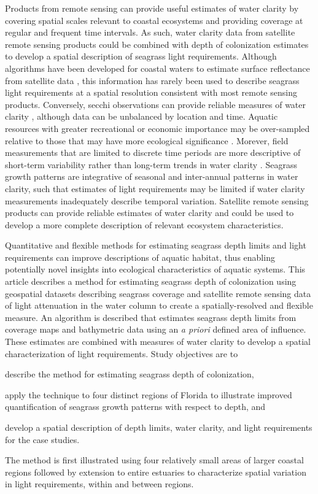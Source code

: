 \documentclass[letterpaper,12pt,oneside]{article}\usepackage[]{graphicx}\usepackage[]{color}
\begin{document}
Products from remote sensing can provide useful estimates of water clarity by covering spatial scales relevant to coastal ecosystems and providing coverage at regular and frequent time intervals.  As such, water clarity data from satellite remote sensing products could be combined with depth of colonization estimates to develop a spatial description of seagrass light requirements.  Although algorithms have been developed for coastal waters to estimate surface reflectance from satellite data \citep{Woodruff99,Chen07}, this information has rarely been used to describe seagrass light requirements at a spatial resolution consistent with most remote sensing products.  Conversely, secchi observations can provide reliable measures of water clarity , although data can be unbalanced by location and time.  Aquatic resources with greater recreational or economic importance may be over-sampled relative to those that may have more ecological significance \citep{Wagner08,Lottig14}.  Morever, field measurements that are limited to discrete time periods are more descriptive of short-term variability rather than long-term trends in water clarity \citep{Elsdon09}.  Seagrass growth patterns are integrative of seasonal and inter-annual patterns in water clarity, such that estimates of light requirements may be limited if water clarity measurements inadequately describe temporal variation.  Satellite remote sensing products can provide reliable estimates of water clarity and could be used to develop a more complete description of relevant ecosystem characteristics.  

Quantitative and flexible methods for estimating seagrass depth limits and light requirements can improve descriptions of aquatic habitat, thus enabling potentially novel insights into ecological characteristics of aquatic systems.  This article describes a method for estimating seagrass depth of colonization using geospatial datasets describing seagrass coverage and satellite remote sensing data of light attenuation in the water column to create a spatially-resolved and flexible measure.  An algorithm is described that estimates seagrass depth limits from coverage maps and bathymetric data using an \textit{a priori} defined area of influence. These estimates are combined with measures of water clarity to develop a spatial characterization of light requirements.  Study objectives are to\begin{inparaenum}[1\upshape)]
\item describe the method for estimating seagrass depth of colonization, 
\item apply the technique to four distinct regions of Florida to illustrate improved quantification of seagrass growth patterns with respect to depth, and
\item develop a spatial description of depth limits, water clarity, and light requirements for the case studies.  
\end{inparaenum}
The method is first illustrated using four relatively small areas of larger coastal regions followed by extension to entire estuaries to characterize spatial variation in light requirements, within and between regions.
\end{document}
